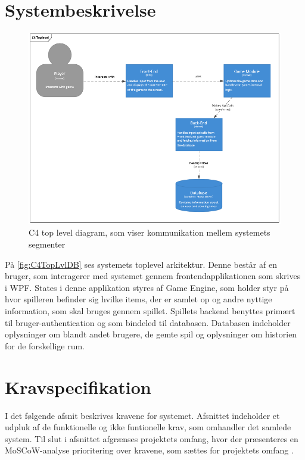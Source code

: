 \section{Systembeskrivelse}

\begin{figure}[H]
\centering
\includegraphics[width = \textwidth]{02-Body/Images/C4TopLvlDB}
\caption{C4 top level diagram, som viser kommunikation mellem systemets segmenter}
\label{fig:C4TopLvlDB}
\end{figure}

På \autoref{fig:C4TopLvlDB} ses systemets toplevel arkitektur.
Denne består af en bruger, som interagerer med systemet gennem frontendapplikationen som skrives i WPF. States i denne applikation styres af Game Engine,
som holder styr på hvor spilleren befinder sig hvilke items, der er samlet op og andre nyttige information, som skal bruges gennem spillet.
Spillets backend benyttes primært til bruger-authentication og som bindeled til databasen.
Databasen indeholder oplysninger om blandt andet brugere, de gemte spil og oplysninger om historien for de forskellige rum.

\newpage

\section{Kravspecifikation}
\label{sec:kravspec}

I det følgende afsnit beskrives kravene for systemet. Afsnittet indeholder et udpluk af de funktionelle og ikke funtionelle krav, som omhandler det samlede system.
Til slut i afsnittet afgrænses projektets omfang, hvor der præsenteres en MoSCoW-analyse prioritering over kravene, som sættes for projektets omfang \parencite[Section 6][]{TekniskBilag}.\\  


